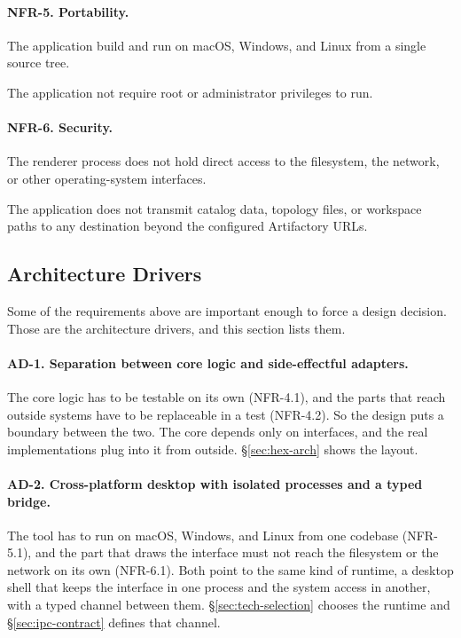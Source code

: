 \paragraph{NFR-5. Portability.}
\begin{reqlist}
    \item[NFR-5.1.] The application build and run on macOS, Windows, and Linux from a single source tree.
    \item[NFR-5.2.] The application not require root or administrator privileges to run.
\end{reqlist}

\paragraph{NFR-6. Security.}
\begin{reqlist}
    \item[NFR-6.1.] The renderer process does not hold direct access to the filesystem, the network, or other operating-system interfaces.
    \item[NFR-6.2.] The application does not transmit catalog data, topology files, or workspace paths to any destination beyond the configured Artifactory URLs.
\end{reqlist}

\subsection{Architecture Drivers}
\label{sec:arch-drivers}

Some of the requirements above are important enough to force a design decision. Those are the architecture drivers, and this section lists them. 

\paragraph{AD-1. Separation between core logic and side-effectful adapters.}
The core logic has to be testable on its own (NFR-4.1), and the parts that reach outside systems have to be replaceable in a test (NFR-4.2). So the design puts a boundary between the two. The core depends only on interfaces, and the real implementations plug into it from outside. \S\ref{sec:hex-arch} shows the layout.

\paragraph{AD-2. Cross-platform desktop with isolated processes and a typed bridge.}
The tool has to run on macOS, Windows, and Linux from one codebase (NFR-5.1), and the part that draws the interface must not reach the filesystem or the network on its own (NFR-6.1). Both point to the same kind of runtime, a desktop shell that keeps the interface in one process and the system access in another, with a typed channel between them. \S\ref{sec:tech-selection} chooses the runtime and \S\ref{sec:ipc-contract} defines that channel.

